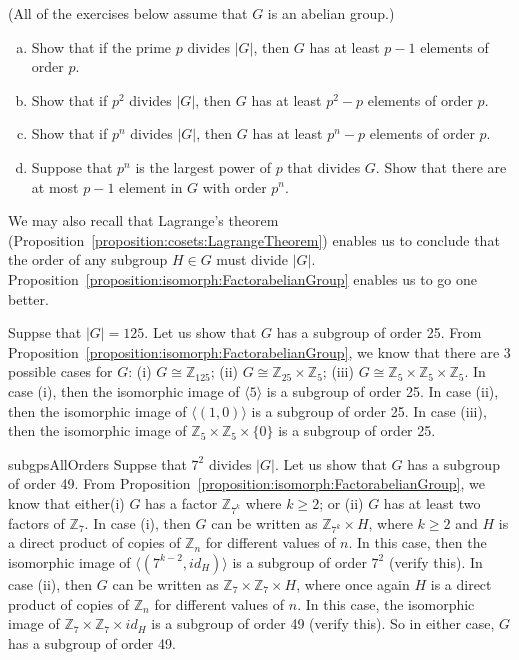 \begin{exercise}{}
(All of the exercises below assume that $G$ is an abelian group.)
\begin{enumerate}[(a)]
\item
Show that if the prime $p$ divides $|G|$, then $G$ has at least $p-1$ elements of order $p$.
\item
Show that if $p^2$ divides $|G|$, then $G$ has at least $p^2 - p$ elements of order $p$.
\item
Show that if $p^n$ divides $|G|$, then $G$ has at least $p^n - p$ elements of order $p$.
\item
Suppose that $p^n$ is the largest power of $p$ that divides $G$. Show that there are at most $p-1$ element in $G$ with order $p^n$. 
\end{enumerate}
\end{exercise}

We may also recall that Lagrange's theorem  (Proposition~\ref{proposition:cosets:LagrangeTheorem})  enables us to conclude that the order of any subgroup $H \in G$ must divide $|G|$.   Proposition~\ref{proposition:isomorph:FactorabelianGroup} enables us to go one better.

\begin{example}{}
 Suppse that $|G| = 125.$  Let us show that $G$ has a subgroup of order 25.  From Proposition~\ref{proposition:isomorph:FactorabelianGroup}, we know that there are 3 possible cases for $G$:  (i) $G \cong {\mathbb Z}_{125}$; (ii) $G \cong {\mathbb Z}_{25} \times {\mathbb Z}_5$; (iii) $G \cong {\mathbb Z}_5 \times {\mathbb Z}_5 \times {\mathbb Z}_5$.  In case (i), then the isomorphic image of $\langle 5 \rangle$ is a subgroup of order 25.  In case (ii), then the isomorphic image of $\langle (1,0) \rangle$ is a subgroup of order 25.  In case (iii), then the isomorphic image of ${\mathbb Z}_5 \times {\mathbb Z}_5 \times \{0\}$ is a subgroup of order 25.
 \end{example}

\begin{example}{subgpsAllOrders}
 Suppse that $7^2$ divides $|G|$.  Let us show that $G$ has a subgroup of order 49.  From Proposition~\ref{proposition:isomorph:FactorabelianGroup}, we know that either(i) $G$ has a factor ${\mathbb Z}_{7^k}$ where $k \ge 2$;  or (ii) $G$ has at least two factors of ${\mathbb Z}_7$. In case (i), then $G$ can be written as ${\mathbb Z}_{7^k} \times H$, where $k \ge 2$ and $H$ is a direct product of copies of ${\mathbb Z_n}$ for different values of $n$.  In this case, then the isomorphic image of $\langle (7^{k-2},id_H) \rangle$ is a subgroup of order $7^2$ (verify this). In case (ii), then $G$ can be written as ${\mathbb Z}_7 \times {\mathbb Z}_7 \times  H$, where once again $H$  is a direct product of copies of ${\mathbb Z_n}$ for different values of $n$. In this case, the isomorphic image of 
 ${\mathbb Z}_7 \times {\mathbb Z}_7 \times  id_H$ is a subgroup of order 49 (verify this).  So in either case, $G$ has a subgroup of order 49.
 \end{example}

